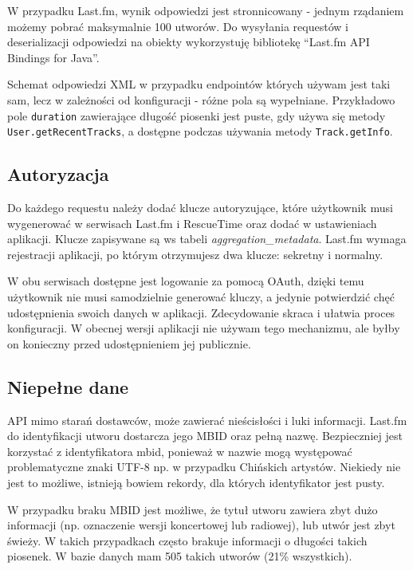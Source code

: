 \documentclass[openright]{xmgr}
\begin{document}
            W przypadku Last.fm, wynik odpowiedzi jest stronnicowany - jednym rządaniem możemy pobrać maksymalnie 100 utworów.
            Do wysyłania requestów i deserializacji odpowiedzi na obiekty
            wykorzystuję bibliotekę ``Last.fm API Bindings for Java''\cite{lastfm:java-bindings}.

            Schemat odpowiedzi XML w przypadku endpointów których używam jest taki sam, lecz w zależności od konfiguracji - różne pola są wypełniane.
            Przykładowo pole \verb|duration| zawierające długość piosenki jest puste, gdy używa się metody \verb|User.getRecentTracks|,
            a dostępne podczas używania metody \verb|Track.getInfo|.

        \subsection*{Autoryzacja}

        Do każdego requestu należy dodać klucze autoryzujące,
        które użytkownik musi wygenerować w serwisach Last.fm i RescueTime \cite{rescuetime:apidoc-keymanagment} oraz dodać w ustawieniach aplikacji.
        Klucze zapisywane są ws tabeli \textit{aggregation\_metadata}.
        Last.fm wymaga rejestracji aplikacji, po którym otrzymujesz dwa klucze: sekretny i normalny.

        W obu serwisach dostępne jest logowanie za pomocą OAuth, dzięki temu użytkownik nie musi samodzielnie generować kluczy,
        a jedynie potwierdzić chęć udostępnienia swoich danych w aplikacji. Zdecydowanie skraca i ułatwia proces konfiguracji.
        W obecnej wersji aplikacji nie używam tego mechanizmu, ale byłby on konieczny przed udostępnieniem jej publicznie.

        \subsection*{Niepełne dane}
        API mimo starań dostawców, może zawierać nieścisłości i luki informacji.
        Last.fm do identyfikacji utworu dostarcza jego MBID oraz pełną nazwę.
        Bezpieczniej jest korzystać z identyfikatora mbid, ponieważ w nazwie mogą występować problematyczne znaki UTF-8 np. w przypadku Chińskich artystów.
        Niekiedy nie jest to możliwe, istnieją bowiem rekordy, dla których identyfikator jest pusty.

        W przypadku braku MBID jest możliwe,
        że tytuł utworu zawiera zbyt dużo informacji (np. oznaczenie wersji koncertowej lub radiowej),
        lub utwór jest zbyt świeży. W takich przypadkach często brakuje informacji o długości takich piosenek.
        W bazie danych mam 505 takich utworów (21\% wszystkich).
\end{document}
